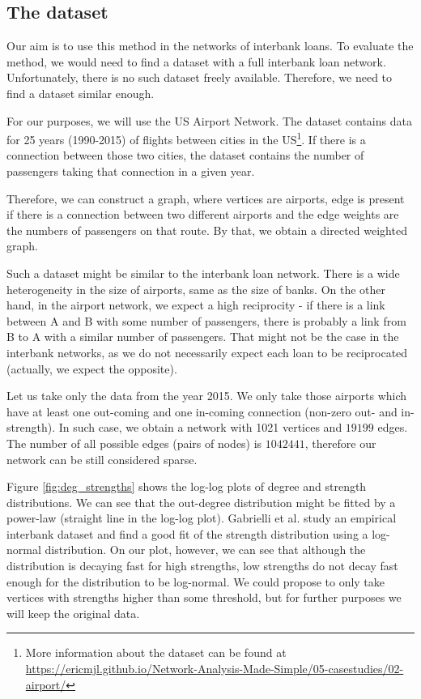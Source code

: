 \subsection{The dataset}
Our aim is to use this method in the networks of interbank loans. To evaluate the method, we would need to find a dataset with a full interbank loan network. Unfortunately, there is no such dataset freely available. Therefore, we need to find a dataset similar enough. 

For our purposes, we will use the US Airport Network. The dataset contains data for 25 years (1990-2015) of flights between cities in the US\footnote{More information about the dataset can be found at \href{https://ericmjl.github.io/Network-Analysis-Made-Simple/05-casestudies/02-airport/}{https://ericmjl.github.io/Network-Analysis-Made-Simple/05-casestudies/02-airport/}}. If there is a connection between those two cities, the dataset contains the number of passengers taking that connection in a given year. 

Therefore, we can construct a graph, where vertices are airports, edge is present if there is a connection between two different airports and the edge weights are the numbers of passengers on that route. By that, we obtain a directed weighted graph. 

Such a dataset might be similar to the interbank loan network. There is a wide heterogeneity in the size of airports, same as the size of banks. On the other hand, in the airport network, we expect a high reciprocity - if there is a link between A and B with some number of passengers, there is probably a link from B to A with a similar number of passengers. That might not be the case in the interbank networks, as we do not necessarily expect each loan to be reciprocated (actually, we expect the opposite). 

Let us take only the data from the year 2015. We only take those airports which have at least one out-coming and one in-coming connection (non-zero out- and in-strength). In such case, we obtain a network with 1021 vertices and $19\mathpunct{}199$ edges. The number of all possible edges (pairs of nodes) is $1\mathpunct{}042\mathpunct{}441$, therefore our network can be still considered sparse. 

Figure \ref*{fig:deg_strengths} shows the log-log plots of degree and strength distributions. We can see that the out-degree distribution might be fitted by a power-law (straight line in the log-log plot). Gabrielli et al. \cite{Gabrielli2024} study an empirical interbank dataset and find a good fit of the strength distribution using a log-normal distribution. On our plot, however, we can see that although the distribution is decaying fast for high strengths, low strengths do not decay fast enough for the distribution to be log-normal. We could propose to only take vertices with strengths higher than some threshold, but for further purposes we will keep the original data.

